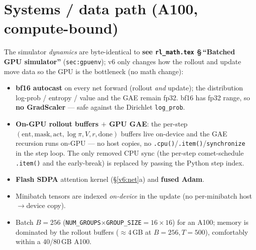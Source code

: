 \documentclass[11pt]{article}
\newcommand{\cd}[1]{\texttt{#1}}
\newcommand{\rlref}[2]{\textbf{see \texttt{rl\_math.tex} \S\,``#1''} (\texttt{#2})}
\begin{document}
\section{Systems / data path (A100, compute-bound)}\label{v6:sys}
The simulator \emph{dynamics} are byte-identical to \rlref{Batched GPU simulator}{sec:gpuenv}; v6 only
changes how the rollout and update move data so the GPU is the bottleneck (no math change):
\begin{itemize}[nosep,leftmargin=1.4em]
  \item \textbf{bf16 autocast} on every net forward (rollout \emph{and} update); the distribution
        log-prob / entropy / value and the GAE remain fp32. bf16 has fp32 range, so \textbf{no GradScaler}
        --- safe against the Dirichlet \cd{log\_prob}.
  \item \textbf{On-GPU rollout buffers $+$ GPU GAE}: the per-step $(\text{ent},\text{mask},\text{act},\log\pi,V,r,\text{done})$
        buffers live on-device and the GAE recursion runs on-GPU --- no host copies, no
        \cd{.cpu()}/\cd{.item()}/\cd{synchronize} in the step loop. The only removed CPU sync (the per-step
        comet-schedule \cd{.item()} and the early-break) is replaced by passing the Python step index.
  \item \textbf{Flash SDPA} attention kernel (\S\ref{v6:net}a) and \textbf{fused Adam}.
  \item Minibatch tensors are indexed \emph{on-device} in the update (no per-minibatch host$\to$device copy).
  \item Batch $B=256$ (\cd{NUM\_GROUPS}$\times$\cd{GROUP\_SIZE}$=16\times16$) for an A100; memory is
        dominated by the rollout buffers ($\approx\!4$\,GB at $B{=}256,T{=}500$), comfortably within a 40/80\,GB A100.
\end{itemize}

\end{document}
